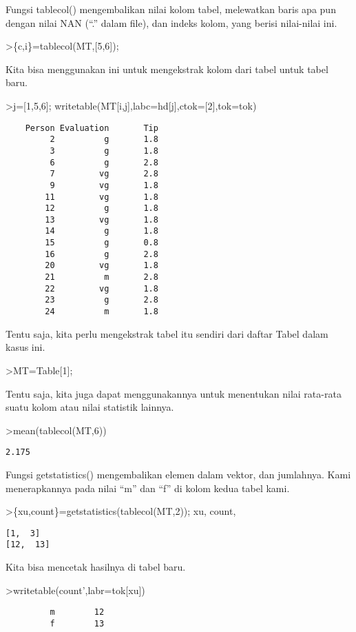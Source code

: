\documentclass[
]{book}
\begin{document}
Fungsi tablecol() mengembalikan nilai kolom tabel, melewatkan baris apa pun dengan nilai NAN (``.'' dalam file), dan indeks kolom, yang berisi nilai-nilai ini.

\textgreater\{c,i\}=tablecol(MT,{[}5,6{]});

Kita bisa menggunakan ini untuk mengekstrak kolom dari tabel untuk tabel baru.

\textgreater j={[}1,5,6{]}; writetable(MT{[}i,j{]},labc=hd{[}j{]},ctok={[}2{]},tok=tok)

\begin{verbatim}
    Person Evaluation       Tip
         2          g       1.8
         3          g       1.8
         6          g       2.8
         7         vg       2.8
         9         vg       1.8
        11         vg       1.8
        12          g       1.8
        13         vg       1.8
        14          g       1.8
        15          g       0.8
        16          g       2.8
        20         vg       1.8
        21          m       2.8
        22         vg       1.8
        23          g       2.8
        24          m       1.8
\end{verbatim}

Tentu saja, kita perlu mengekstrak tabel itu sendiri dari daftar Tabel dalam kasus ini.

\textgreater MT=Table{[}1{]};

Tentu saja, kita juga dapat menggunakannya untuk menentukan nilai rata-rata suatu kolom atau nilai statistik lainnya.

\textgreater mean(tablecol(MT,6))

\begin{verbatim}
2.175
\end{verbatim}

Fungsi getstatistics() mengembalikan elemen dalam vektor, dan jumlahnya. Kami menerapkannya pada nilai ``m'' dan ``f'' di kolom kedua tabel kami.

\textgreater\{xu,count\}=getstatistics(tablecol(MT,2)); xu, count,

\begin{verbatim}
[1,  3]
[12,  13]
\end{verbatim}

Kita bisa mencetak hasilnya di tabel baru.

\textgreater writetable(count',labr=tok{[}xu{]})

\begin{verbatim}
         m        12
         f        13
\end{verbatim}
\end{document}
